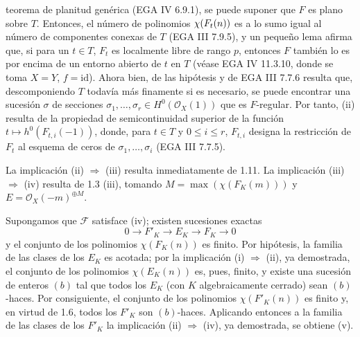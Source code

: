teorema de planitud genérica (EGA IV 6.9.1), se puede suponer que \(F\) es
plano sobre \(T\). Entonces, el número de polinomios \(\chi(\sisi{F}{F_t}(n))\) es a lo %
sumo igual al número de componentes conexas de \(T\) (EGA III 7.9.5), y un
pequeño lema afirma que, si para un \(t\in T\), \(F_t\) es localmente libre
de rango \(p\), entonces \(F\) también lo es por encima de un entorno
abierto de \(t\) en \(T\) (véase EGA IV 11.3.10, donde se toma \(X=Y\),
\(f=\mathrm{id}\)). Ahora bien, de las hipótesis y de EGA III 7.7.6 resulta
que, descomponiendo \(T\) todavía más finamente si es necesario, se puede
encontrar una sucesión \(\sigma\) de secciones
\(\sigma_1,\ldots,\sigma_r\in H^0(\mathcal O_X(1))\) que es
\(F\)-regular. Por tanto, (ii) resulta de la propiedad de semicontinuidad
superior de la función \(t\longmapsto h^0(F_{t,i}(-1))\), donde, para
\(t\in T\) y \(0\le i\le r\), \(F_{t,i}\) designa la restricción de \(F_t\)
al esquema de ceros de \(\sigma_1,\ldots,\sigma_i\) (EGA III 7.7.5).

La implicación (ii) \(\Rightarrow\) (iii) resulta inmediatamente de 1.11.
La implicación (iii) \(\Rightarrow\) (iv) resulta de 1.3 (iii), tomando
\(M=\max(\chi(F_K(m)))\) y \(E=\mathcal O_X(-m)^{\oplus M}\).

Supongamos que \(\mathcal F\) satisface (iv); existen sucesiones exactas
\[
0\longrightarrow F'_K\longrightarrow E_K\longrightarrow F_K\longrightarrow0
\]
y el conjunto de los polinomios \(\chi(F_K(n))\) es finito. Por hipótesis,
la familia de las clases de los \(E_K\) es acotada; por la implicación (i)
\(\Rightarrow\) (ii), ya demostrada, el conjunto de los polinomios
\(\chi(E_K(n))\) es, pues, finito, y existe una sucesión de enteros \((b)\)
tal que todos los \(E_K\) (con \(K\) algebraicamente cerrado) sean
\((b)\)-haces. Por consiguiente, el conjunto de los polinomios
\(\chi(F'_K(n))\) es finito y, en virtud de 1.6, todos los \(F'_K\) son
\((b)\)-haces. Aplicando entonces a la familia de las clases de los \(F'_K\)
la implicación (ii) \(\Rightarrow\) (iv), ya demostrada, se obtiene (v).

